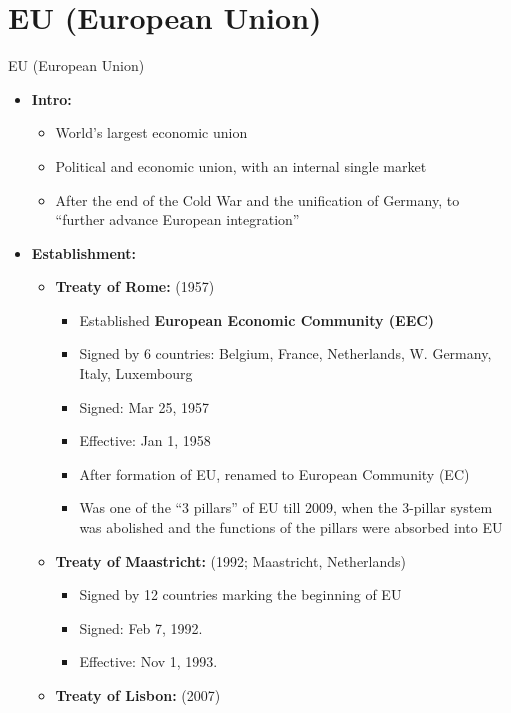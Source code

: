\documentclass[
  12pt,
  ignorenonframetext,
  progressbar=frametitle]{beamer}
\providecommand{\tightlist}{%
  \setlength{\itemsep}{0pt}\setlength{\parskip}{0pt}}
\begin{document}
\section{EU (European Union)}
\begin{frame}[allowframebreaks]
{EU (European Union)}
\protect\hypertarget{eu-european-union}{}
\begin{itemize}
\tightlist
\item
  \textbf{Intro:}

  \begin{itemize}
  \tightlist
  \item
    World's largest economic union
  \item
    Political and economic union, with an internal single market
  \item
    After the end of the Cold War and the unification of Germany, to
    ``further advance European integration''
  \end{itemize}
\item
  \textbf{Establishment:}

  \begin{itemize}
  \tightlist
  \item
    \textbf{Treaty of Rome:} (1957)

    \begin{itemize}
    \tightlist
    \item
      Established \textbf{European Economic Community (EEC)}
    \item
      Signed by 6 countries: Belgium, France, Netherlands, W. Germany,
      Italy, Luxembourg
    \item
      Signed: Mar 25, 1957
    \item
      Effective: Jan 1, 1958
    \item
      After formation of EU, renamed to European Community (EC)
    \item
      Was one of the ``3 pillars'' of EU till 2009, when the 3-pillar
      system was abolished and the functions of the pillars were
      absorbed into EU
    \end{itemize}
  \item
    \textbf{Treaty of Maastricht:} (1992; Maastricht, Netherlands)

    \begin{itemize}
    \tightlist
    \item
      Signed by 12 countries marking the beginning of EU
    \item
      Signed: Feb 7, 1992.
    \item
      Effective: Nov 1, 1993.
    \end{itemize}
  \item
    \textbf{Treaty of Lisbon:} (2007)


\end{itemize}
\end{itemize}
\end{frame}
\end{document}
